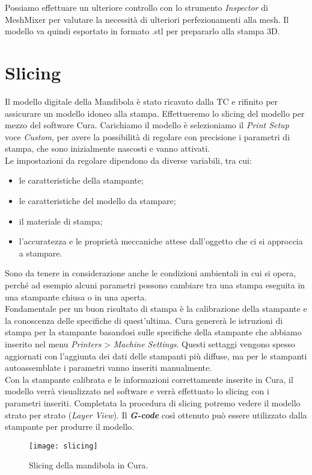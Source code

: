 Possiamo effettuare un ulteriore controllo con lo strumento \emph{Inspector} di MeshMixer per valutare la necessità di ulteriori perfezionamenti alla mesh.
Il modello va quindi esportato in formato .stl per prepararlo alla stampa 3D.


\section{Slicing}
Il modello digitale della Mandibola è stato ricavato dalla TC e rifinito per assicurare un modello idoneo alla stampa. Effettueremo lo slicing del modello per mezzo del software Cura.
Carichiamo il modello è selezioniamo il \emph{Print Setup} voce \emph{Custom}, per avere la possibilità di regolare con precisione i parametri di stampa, che sono inizialmente nascosti e vanno attivati.\\
Le impostazioni da regolare dipendono da diverse variabili, tra cui:

\begin{itemize}
\item le caratteristiche della stampante;
\item le caratteristiche del modello da stampare;
\item il materiale di stampa;
\item l'accuratezza e le proprietà meccaniche attese dall'oggetto che ci si approccia a stampare.
\end{itemize}
	
Sono da tenere in considerazione anche le condizioni ambientali in cui si opera, perché ad esempio alcuni parametri possono cambiare tra una stampa eseguita in una stampante chiusa o in una aperta.\\
Fondamentale per un buon risultato di stampa è la calibrazione della stampante e la conoscenza delle specifiche di quest'ultima. Cura genererà le istruzioni di stampa per la stampante basandosi sulle specifiche della stampante che abbiamo inserito nel menu \emph{Printers} > \emph{Machine Settings}. Questi settaggi vengono spesso aggiornati con l'aggiunta dei dati delle stampanti più diffuse, ma per le stampanti autoassemblate i parametri vanno inseriti manualmente.\\
Con la stampante calibrata e le informazioni correttamente inserite in Cura, il modello verrà visualizzato nel software e verrà effettuato lo slicing con i parametri inseriti. Completata la procedura di slicing potremo vedere il modello strato per strato (\emph{Layer View}).
Il \emph{\textbf{G-code}} così ottenuto può essere utilizzato dalla stampante per produrre il modello.
\begin{figure}[t]
\centering
\texttt{[image: slicing]}
\caption{Slicing della mandibola in Cura.}
\label{fig:slicing}
\end{figure}

